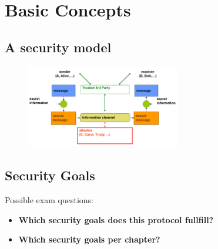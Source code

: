 \documentclass[11pt,british,faculty=ea,layout=titlefont,underline=false,titleUppercase=true,titleUnderline=true,hidelinks]{ugent2016-report}
\begin{document}
\chapter{Basic Concepts} \label{cha:basic-concepts}
	\section{A security model} \label{sec:a-security⁻model}
		\begin{figure}[h]
			\centering
			\includegraphics[width=0.6\textwidth]{images/network-security-model.png}    
		\end{figure}

	\section{Security Goals} \label{sec:security-goals}
		Possible exam questions:
		\begin{itemize}
			\item \textbf{Which security goals does this protocol fullfill?}
			\item \textbf{Which security goals per chapter?}
		\end{itemize} 
\end{document}
